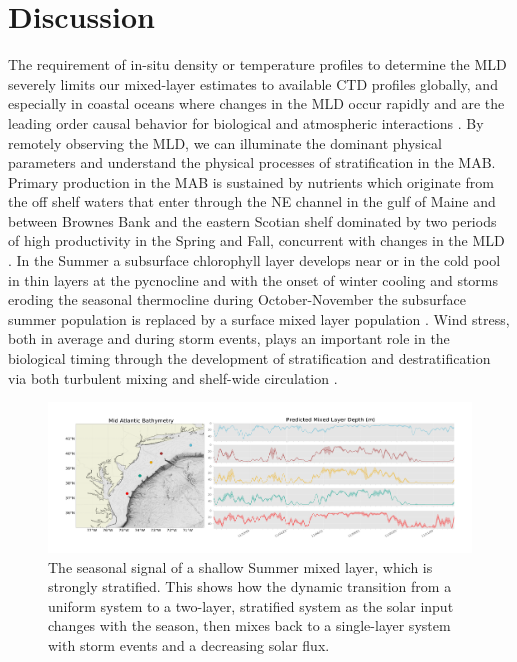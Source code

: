 \documentclass{article}
\begin{document}
\section*{Discussion}
The requirement of in-situ density or temperature profiles to determine the MLD severely limits our mixed-layer estimates to available CTD profiles globally, and especially in coastal oceans where changes in the MLD occur rapidly and are the leading order causal behavior for biological \cite{walsh1988simulation,fernandez1996coupling,shroyer2014stratification} and atmospheric interactions \cite{Miles2013,Seroka2016}.
By remotely observing the MLD, we can illuminate the dominant physical parameters and understand the physical processes of stratification in the MAB.
Primary production in the MAB is sustained by nutrients which originate from the off shelf waters that enter through the NE channel in the gulf of Maine and between Brownes Bank and the eastern Scotian shelf dominated by two periods of high productivity in the Spring and Fall, concurrent with changes in the MLD \cite{bigelow1933studies,marra1990phytoplankton,friedland2015spring}.
In the Summer a subsurface chlorophyll layer develops near or in the cold pool in thin layers at the pycnocline and with the onset of winter cooling and storms eroding the seasonal thermocline during October-November the subsurface summer population is replaced by a surface mixed layer population \cite{flagg1994interaction}.
Wind stress, both in average and during storm events, plays an important role in the biological timing through the development of stratification and destratification via both turbulent mixing and shelf-wide circulation \cite{Austin2002,xu2013role}.
\begin{figure}[h]
\caption{The seasonal signal of a shallow Summer mixed layer, which is strongly stratified. This shows how the dynamic transition from a uniform system to a two-layer, stratified system as the solar input changes with the season, then mixes back to a single-layer system with storm events and a decreasing solar flux.}
\centering
\includegraphics[width=1.0\textwidth]{predicted_ML_MAB_shallowing.pdf}
\end{figure}
\end{document}
